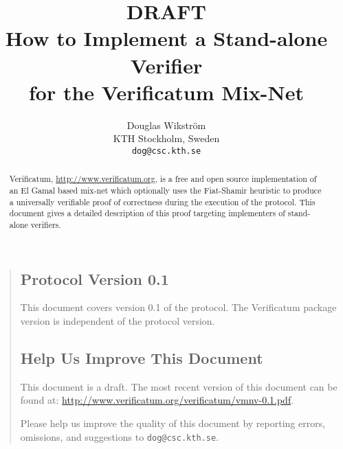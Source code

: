 \documentclass[11pt]{article}
\title{{\Huge DRAFT}\\$\quad$\\How to Implement a Stand-alone Verifier \\for the Verificatum Mix-Net}
\author{Douglas Wikstr{\"o}m\\
KTH Stockholm, Sweden\\
\texttt{dog@csc.kth.se}}
\begin{document}


\maketitle

\thispagestyle{empty}

\begin{abstract}

  Verificatum, \url{http://www.verificatum.org}, is a free and open
  source implementation of an El Gamal based mix-net which optionally
  uses the Fiat-Shamir heuristic to produce a universally verifiable
  proof of correctness during the execution of the protocol. This
  document gives a detailed description of this proof targeting
  implementers of stand-alone verifiers.

\end{abstract}

\begin{quote}

\subsection*{Protocol Version 0.1}

This document covers version 0.1 of the protocol. The Verificatum
package version is independent of the protocol version.


\vfill

\subsection*{Help Us Improve This Document}

This document is a draft. The most recent version of this
document can be found at:
\url{http://www.verificatum.org/verificatum/vmnv-0.1.pdf}.

Please help us improve the quality of this document by reporting
errors, omissions, and suggestions to
\texttt{dog@csc.kth.se}.


\end{quote}

\newpage

\begin{spacing}{0.9}

  \tableofcontents

\end{spacing}

\clearpage

\pagestyle{plain}
\setcounter{page}{1}
\end{document}
